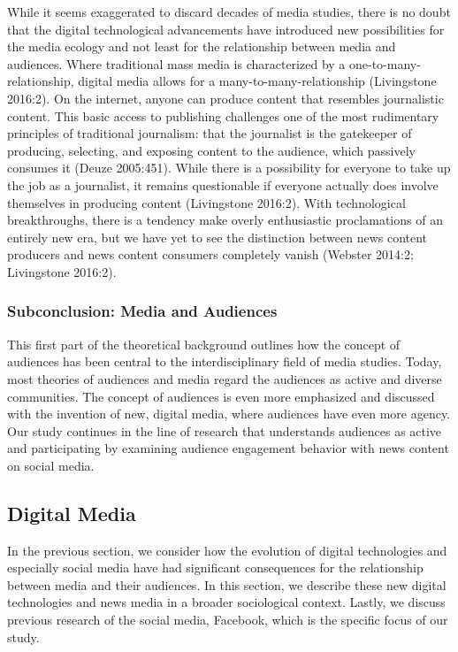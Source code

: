 \documentclass[
]{article}
\begin{document}
While it seems exaggerated to discard decades of media studies, there is
no doubt that the digital technological advancements have introduced new
possibilities for the media ecology and not least for the relationship
between media and audiences. Where traditional mass media is
characterized by a one-to-many-relationship, digital media allows for a
many-to-many-relationship (Livingstone 2016:2). On the internet, anyone
can produce content that resembles journalistic content. This basic
access to publishing challenges one of the most rudimentary principles
of traditional journalism: that the journalist is the gatekeeper of
producing, selecting, and exposing content to the audience, which
passively consumes it (Deuze 2005:451). While there is a possibility for
everyone to take up the job as a journalist, it remains questionable if
everyone actually does involve themselves in producing content
(Livingstone 2016:2). With technological breakthroughs, there is a
tendency make overly enthusiastic proclamations of an entirely new era,
but we have yet to see the distinction between news content producers
and news content consumers completely vanish (Webster 2014:2;
Livingstone 2016:2).

\hypertarget{subconclusion-media-and-audiences}{%
\subsubsection{Subconclusion: Media and
Audiences}\label{subconclusion-media-and-audiences}}

\noindent This first part of the theoretical background outlines how the
concept of audiences has been central to the interdisciplinary field of
media studies. Today, most theories of audiences and media regard the
audiences as active and diverse communities. The concept of audiences is
even more emphasized and discussed with the invention of new, digital
media, where audiences have even more agency. Our study continues in the
line of research that understands audiences as active and participating
by examining audience engagement behavior with news content on social
media.

\hypertarget{digital-media}{%
\subsection{Digital Media}\label{digital-media}}

In the previous section, we consider how the evolution of digital
technologies and especially social media have had significant
consequences for the relationship between media and their audiences. In
this section, we describe these new digital technologies and news media
in a broader sociological context. Lastly, we discuss previous research
of the social media, Facebook, which is the specific focus of our study.
\end{document}
